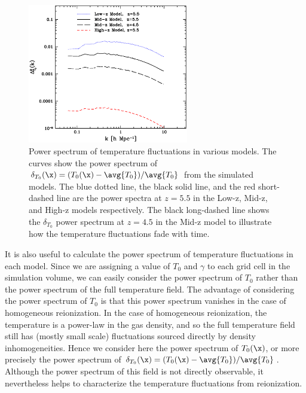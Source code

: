 \begin{figure}
\bc
\includegraphics[width=7cm]{f7.eps}
\caption{Power spectrum of temperature fluctuations in various models. The curves show the power spectrum of 
$\delta_{T_0}(\x) = (T_0(\x) - \avg{T_0})/\avg{T_0}$ from the simulated models. The blue dotted line, the black solid line, and the red short-dashed line
are the power spectra at $z=5.5$ in the Low-z, Mid-z, and High-z models respectively. The black long-dashed line
shows the $\delta_{T_0}$ power spectrum at $z=4.5$ in the Mid-z model to illustrate how the temperature fluctuations fade with
time.}
\label{fig:power_tzero}
\ec
\end{figure}

It is also useful to calculate the power spectrum of temperature fluctuations in each model. Since we are assigning
a value of $T_0$ and $\gamma$ to each grid cell in the simulation volume, we can easily consider the power 
spectrum of $T_0$ rather
than the power spectrum of the full temperature field. The advantage of considering the power spectrum of $T_0$ is that this power
spectrum
vanishes in the case of homogeneous reionization. In the case of homogeneous reionization, the 
temperature is a power-law in the gas density, and so the full temperature field still has (mostly small scale)
fluctuations sourced directly by density inhomogeneities. Hence we consider here the power spectrum of $T_0(\x)$, or more
precisely the power spectrum of $\delta_{T_0}(\x) = (T_0(\x) - \avg{T_0})/\avg{T_0}$. Although the power spectrum of this field
is not directly observable, it nevertheless helps to characterize the temperature fluctuations from reionization.
 
